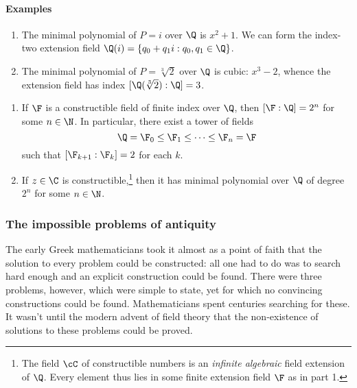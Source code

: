\paragraph{Examples}

\begin{enumerate}
  \item The minimal polynomial of $P=i$ over $\Q$ is $x^2+1$. We can form the index-two  extension field $\Q(i)=\{q_0+q_1i:q_0,q_1\in\Q\}$.
  \item The minimal polynomial of $P=\sqrt[3]{2}$ over $\Q$ is cubic: $x^3-2$, whence the extension field has index $[\Q(\sqrt[3]{2}):\Q]=3$.
\end{enumerate}



\begin{cor}
\begin{enumerate}
  \item If $\F$ is a constructible field of finite index over $\Q$, then $[\F:\Q]=2^n$ for some $n\in\N$. In particular, there exist a tower of fields
  \[\Q=\F_0\le\F_1\le\cdots\le\F_n=\F\]
  such that $[\F_{k+1}:\F_k]=2$ for each $k$.
	\item If $z\in\C$ is constructible,\footnote{The field $\cC$ of constructible numbers is an \emph{infinite algebraic} field extension of $\Q$. Every element thus lies in some finite extension field $\F$ as in part 1.} then it has minimal polynomial over $\Q$ of degree $2^n$ for some $n\in\N$.
\end{enumerate}
\end{cor}


\subsubsection*{The impossible problems of antiquity}

The early Greek mathematicians took it almost as a point of faith that the solution to every problem could be constructed: all one had to do was to search hard enough and an explicit construction could be found. There were three problems, however, which were simple to state, yet for which no convincing constructions could be found. Mathematicians spent centuries searching for these. It wasn't until the modern advent of field theory that the non-existence of solutions to these problems could be proved.


